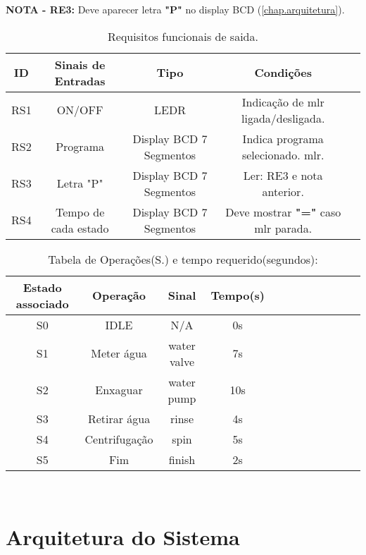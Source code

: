 \textbf{NOTA - RE3:} Deve aparecer letra \textbf{"P"} no display BCD (\autoref{chap.arquitetura}).\\

	
\begin{table}[H]
	\centering
	\caption{Requisitos funcionais de saida.}
	\begin{tabular}{|c|c|c|c|c|}\hline
	
		ID & Sinais de Entradas & Tipo & Condições \\ 
        \hline
        RS1 & ON/OFF & LEDR & Indicação de \ac{mlr} ligada/desligada. \\
		RS2 & Programa & Display BCD 7 Segmentos & Indica programa selecionado. \ac{mlr}. \\	    
	    RS3 & Letra "P" & Display BCD 7 Segmentos & Ler: RE3 e nota anterior. \\ 
		RS4 & Tempo de cada estado & Display BCD 7 Segmentos & Deve mostrar \textbf{"="} caso \ac{mlr} parada.  \\
		
    \hline
    \end{tabular}
    \label{tab.req_funcionais_saida}
\end{table}	

\begin{table}[H]
	\centering
	\caption{Tabela de Operações(S.) e tempo requerido(segundos):}
	\begin{tabular}{|c|c|c|c|c|c|c|c|c|c|c|c|}\hline

		Estado associado & Operação 		& Sinal    	  & Tempo(s) 	\\ 
        \hline		
		S0				 & IDLE				& N/A		  & 0s		\\
		\hline		
		S1				 & Meter água		& water valve & 7s 		\\
		\hline		
		S2				 & Enxaguar			& water pump  & 10s		\\
		\hline		
		S3				 & Retirar água		& rinse		  & 4s		\\
		\hline		
		S4				 & Centrifugação	& spin		  & 5s		\\
		\hline
		S5				 & Fim				& finish	  & 2s		\\
		\hline
    \end{tabular}
    \
    \label{tab.estados}
\end{table}	


\chapter{Arquitetura do Sistema}	
\label{chap.arquitetura}


